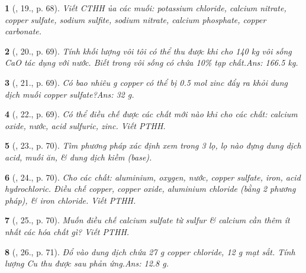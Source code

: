 \documentclass{article}
\newtheorem{baitoan}{}
\begin{document}
\begin{baitoan}[\cite{An_Hoa_Hoc_nang_cao_8_9}, 19., p. 68]
	Viết {\rm CTHH} ủa các muối: potassium chloride, calcium nitrate, copper sulfate, sodium sulfite, sodium nitrate, calcium phosphate, copper carbonate.
\end{baitoan}

\begin{baitoan}[\cite{An_Hoa_Hoc_nang_cao_8_9}, 20., p. 69]
	Tính khối lượng vôi tôi {\rm{}} có thể thu được khi cho {\rm 140 kg} vôi sống {\rm CaO} tác dụng với nước. Biết trong vôi sống có chứa {\rm10\%} tạp chất.\hfill{\sf Ans: 166.5 kg.}
\end{baitoan}

\begin{baitoan}[\cite{An_Hoa_Hoc_nang_cao_8_9}, 21., p. 69]
	Có bao nhiêu {\rm g} copper có thể bị {\rm0.5 mol} zinc đẩy ra khỏi dung dịch muối copper sulfate?\hfill{\sf Ans: 32 g.}
\end{baitoan}

\begin{baitoan}[\cite{An_Hoa_Hoc_nang_cao_8_9}, 22., p. 69]
	Có thể điều chế được các chất mới nào khi cho các chất: calcium oxide, nước, acid sulfuric, zinc. Viết {\rm PTHH}.
\end{baitoan}

\begin{baitoan}[\cite{An_Hoa_Hoc_nang_cao_8_9}, 23., p. 70]
	Tìm phương pháp xác định xem trong 3 lọ, lọ nào đựng dung dịch acid, muối ăn, \& dung dịch kiềm (base).
\end{baitoan}

\begin{baitoan}[\cite{An_Hoa_Hoc_nang_cao_8_9}, 24., p. 70]
	Cho các chất: aluminium, oxygen, nước, copper sulfate, iron, acid hydrochloric. Điều chế copper, copper oxide, aluminium chloride (bằng 2 phương pháp), \& iron chloride. Viết {\rm PTHH}.
\end{baitoan}

\begin{baitoan}[\cite{An_Hoa_Hoc_nang_cao_8_9}, 25., p. 70]
	Muốn điều chế calcium sulfate từ sulfur \& calcium cần thêm ít nhất các hóa chất gì? Viết {\rm PTHH}.
\end{baitoan}

\begin{baitoan}[\cite{An_Hoa_Hoc_nang_cao_8_9}, 26., p. 71]
	Đổ vào dung dịch chứa {\rm27 g} copper chloride, {\rm12 g} mạt sắt. Tính lượng {\rm Cu} thu được sau phản ứng.\hfill{\sf Ans: 12.8 g.}
\end{baitoan}
\end{document}
